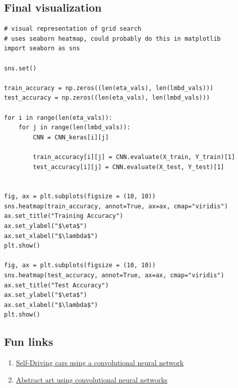 \documentclass[%
oneside,                 %
final,                   %
10pt]{article}
\begin{document}
\subsection*{Final visualization}

\begin{Verbatim}[numbers=none,fontsize=\fontsize{9pt}{9pt},baselinestretch=0.95]
# visual representation of grid search
# uses seaborn heatmap, could probably do this in matplotlib
import seaborn as sns

sns.set()

train_accuracy = np.zeros((len(eta_vals), len(lmbd_vals)))
test_accuracy = np.zeros((len(eta_vals), len(lmbd_vals)))

for i in range(len(eta_vals)):
    for j in range(len(lmbd_vals)):
        CNN = CNN_keras[i][j]

        train_accuracy[i][j] = CNN.evaluate(X_train, Y_train)[1]
        test_accuracy[i][j] = CNN.evaluate(X_test, Y_test)[1]

        
fig, ax = plt.subplots(figsize = (10, 10))
sns.heatmap(train_accuracy, annot=True, ax=ax, cmap="viridis")
ax.set_title("Training Accuracy")
ax.set_ylabel("$\eta$")
ax.set_xlabel("$\lambda$")
plt.show()

fig, ax = plt.subplots(figsize = (10, 10))
sns.heatmap(test_accuracy, annot=True, ax=ax, cmap="viridis")
ax.set_title("Test Accuracy")
ax.set_ylabel("$\eta$")
ax.set_xlabel("$\lambda$")
plt.show()
\end{Verbatim}

\subsection*{Fun links}

\begin{enumerate}
\item \href{{https://arxiv.org/abs/1604.07316}}{Self-Driving cars using a convolutional neural network}

\item \href{{https://deepdreamgenerator.com/}}{Abstract art using convolutional neural networks}
\end{enumerate}

\noindent

\end{document}
